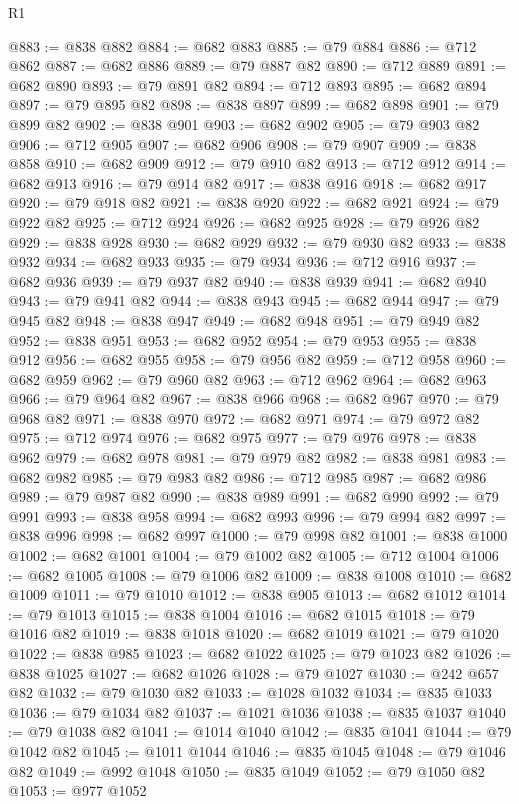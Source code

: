 \begin{lexlean}{R1}
\begin{coremodule}
@883 := @838 @882
@884 := @682 @883
@885 := @79 @884
@886 := @712 @862
@887 := @682 @886
@889 := @79 @887 @82
@890 := @712 @889
@891 := @682 @890
@893 := @79 @891 @82
@894 := @712 @893
@895 := @682 @894
@897 := @79 @895 @82
@898 := @838 @897
@899 := @682 @898
@901 := @79 @899 @82
@902 := @838 @901
@903 := @682 @902
@905 := @79 @903 @82
@906 := @712 @905
@907 := @682 @906
@908 := @79 @907
@909 := @838 @858
@910 := @682 @909
@912 := @79 @910 @82
@913 := @712 @912
@914 := @682 @913
@916 := @79 @914 @82
@917 := @838 @916
@918 := @682 @917
@920 := @79 @918 @82
@921 := @838 @920
@922 := @682 @921
@924 := @79 @922 @82
@925 := @712 @924
@926 := @682 @925
@928 := @79 @926 @82
@929 := @838 @928
@930 := @682 @929
@932 := @79 @930 @82
@933 := @838 @932
@934 := @682 @933
@935 := @79 @934
@936 := @712 @916
@937 := @682 @936
@939 := @79 @937 @82
@940 := @838 @939
@941 := @682 @940
@943 := @79 @941 @82
@944 := @838 @943
@945 := @682 @944
@947 := @79 @945 @82
@948 := @838 @947
@949 := @682 @948
@951 := @79 @949 @82
@952 := @838 @951
@953 := @682 @952
@954 := @79 @953
@955 := @838 @912
@956 := @682 @955
@958 := @79 @956 @82
@959 := @712 @958
@960 := @682 @959
@962 := @79 @960 @82
@963 := @712 @962
@964 := @682 @963
@966 := @79 @964 @82
@967 := @838 @966
@968 := @682 @967
@970 := @79 @968 @82
@971 := @838 @970
@972 := @682 @971
@974 := @79 @972 @82
@975 := @712 @974
@976 := @682 @975
@977 := @79 @976
@978 := @838 @962
@979 := @682 @978
@981 := @79 @979 @82
@982 := @838 @981
@983 := @682 @982
@985 := @79 @983 @82
@986 := @712 @985
@987 := @682 @986
@989 := @79 @987 @82
@990 := @838 @989
@991 := @682 @990
@992 := @79 @991
@993 := @838 @958
@994 := @682 @993
@996 := @79 @994 @82
@997 := @838 @996
@998 := @682 @997
@1000 := @79 @998 @82
@1001 := @838 @1000
@1002 := @682 @1001
@1004 := @79 @1002 @82
@1005 := @712 @1004
@1006 := @682 @1005
@1008 := @79 @1006 @82
@1009 := @838 @1008
@1010 := @682 @1009
@1011 := @79 @1010
@1012 := @838 @905
@1013 := @682 @1012
@1014 := @79 @1013
@1015 := @838 @1004
@1016 := @682 @1015
@1018 := @79 @1016 @82
@1019 := @838 @1018
@1020 := @682 @1019
@1021 := @79 @1020
@1022 := @838 @985
@1023 := @682 @1022
@1025 := @79 @1023 @82
@1026 := @838 @1025
@1027 := @682 @1026
@1028 := @79 @1027
@1030 := @242 @657 @82
@1032 := @79 @1030 @82
@1033 := @1028 @1032
@1034 := @835 @1033
@1036 := @79 @1034 @82
@1037 := @1021 @1036
@1038 := @835 @1037
@1040 := @79 @1038 @82
@1041 := @1014 @1040
@1042 := @835 @1041
@1044 := @79 @1042 @82
@1045 := @1011 @1044
@1046 := @835 @1045
@1048 := @79 @1046 @82
@1049 := @992 @1048
@1050 := @835 @1049
@1052 := @79 @1050 @82
@1053 := @977 @1052

\end{coremodule}
\end{lexlean}
